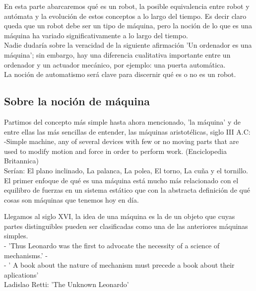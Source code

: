 


En esta parte abarcaremos qué es un robot, la posible equivalencia entre robot y autómata y la evolución de estos conceptos a lo largo del tiempo. Es decir claro queda que un robot debe ser un tipo de máquina, pero la noción de lo que es una máquina ha variado significativamente a lo largo del tiempo. \\

Nadie dudaría sobre la veracidad de la siguiente afirmación 'Un ordenador es una máquina'; sin embargo, hay una diferencia cualitativa importante entre un ordenador y un actuador mecánico, por ejemplo: una puerta automática. \\

La noción de automatismo será clave para discernir qué es o no es un robot. \\

\subsection{ Sobre la noción de máquina}


Partimos del concepto más simple hasta ahora mencionado, 'la máquina' y de entre ellas las más sencillas de entender, las máquinas aristotélicas, siglo III A.C: \\

-Simple machine, any of several devices with few or no moving parts that are used to modify motion and force in order to perform work. (Enciclopedia Britannica) \\


Serían: El plano inclinado, La palanca, La polea, El torno, La cuña y el tornillo. El primer enfoque de qué es una máquina está mucho más relacionado con el equilibro de fuerzas en un sistema estático que con la abstracta definición de qué cosas son máquinas que tenemos hoy en día. 

Llegamos al siglo XVI, la idea de una máquina es la de un objeto que cuyas partes distinguibles pueden ser clasificadas como una de las anteriores máquinas simples. \\

- 'Thus Leonardo was the first to advocate the necessity of a science of mechanisms.' -  \\

- ' A book about the nature of mechanism must precede a book about their aplications' \\

Ladislao Retti: 'The Unknown Leonardo' \\

